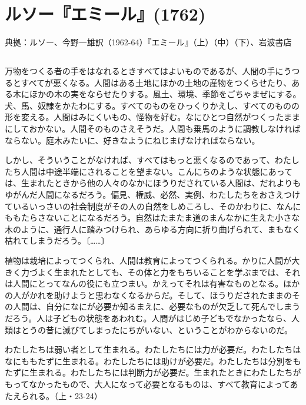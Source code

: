 \pagebreak{}



\section{ルソー『エミール』(1762)}



典拠：ルソー、今野一雄訳（1962-64）『エミール』（上）（中）（下）、岩波書店

\subsection{}



万物をつくる者の手をはなれるときすべてはよいものであるが、人間の手にうつるとすべてが悪くなる。人間はある土地にほかの土地の産物をつくらせたり、ある木にほかの木の実をならせたりする。風土、環境、季節をごちゃまぜにする。犬、馬、奴隷をかたわにする。すべてのものをひっくりかえし、すべてのものの形を変える。人間はみにくいもの、怪物を好む。なにひとつ自然がつくったままにしておかない。人間そのものさえそうだ。人間も乗馬のように調教しなければならない。庭木みたいに、好きなようにねじまげなければならない。

しかし、そういうことがなければ、すべてはもっと悪くなるのであって、わたしたち人間は中途半端にされることを望まない。こんにちのような状態にあっては、生まれたときから他の人々のなかにほうりだされている人間は、だれよりもゆがんだ人間になるだろう。偏見、権威、必然、実例、わたしたちをおさえつけているいっさいの社会制度がその人の自然をしめころし、そのかわりに、なんにももたらさないことになるだろう。自然はたまたま道のまんなかに生えた小さな木のように、通行人に踏みつけられ、あらゆる方向に折り曲げられて、まもなく枯れてしまうだろう。〔……〕

植物は栽培によってつくられ、人間は教育によってつくられる。かりに人間が大きく力づよく生まれたとしても、その体と力をもちいることを学ぶまでは、それは人間にとってなんの役にも立つまい。かえってそれは有害なものとなる。ほかの人がかれを助けようと思わなくなるからだ。そして、ほうりだされたままのその人間は、自分になにが必要か知るまえに、必要なものが欠乏して死んでしまうだろう。人は子どもの状態をあわれむ。人間がはじめ子どもでなかったなら、人類はとうの昔に滅びてしまったにちがいない、ということがわからないのだ。

わたしたちは弱い者として生まれる。わたしたちには力が必要だ。わたしたちはなにももたずに生まれる。わたしたちには助けが必要だ。わたしたちは分別をもたずに生まれる。わたしたちには判断力が必要だ。生まれたときにわたしたちがもってなかったもので、大人になって必要となるものは、すべて教育によってあたえられる。（上・23-24）

